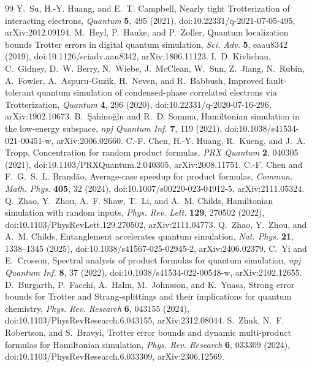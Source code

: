 \documentclass[11pt]{article}
\theoremstyle{plain}
\theoremstyle{definition}
\theoremstyle{remark}
\begin{document}
\begin{thebibliography}{99}
 Y.~Su, H.-Y. Huang, and E.~T. Campbell, Nearly tight Trotterization of interacting electrons, \emph{Quantum} \textbf{5}, 495 (2021), doi:10.22331/q-2021-07-05-495, arXiv:2012.09194.
 M.~Heyl, P.~Hauke, and P.~Zoller, Quantum localization bounds Trotter errors in digital quantum simulation, \emph{Sci. Adv.} \textbf{5}, eaau8342 (2019), doi:10.1126/sciadv.aau8342, arXiv:1806.11123.
 I.~D. Kivlichan, C.~Gidney, D.~W. Berry, N.~Wiebe, J.~McClean, W.~Sun, Z.~Jiang, N.~Rubin, A.~Fowler, A.~Aspuru-Guzik, H.~Neven, and R.~Babbush, Improved fault-tolerant quantum simulation of condensed-phase correlated electrons via Trotterization, \emph{Quantum} \textbf{4}, 296 (2020), doi:10.22331/q-2020-07-16-296, arXiv:1902.10673.
 B.~\c{S}ahino\u{g}lu and R.~D. Somma, Hamiltonian simulation in the low-energy subspace, \emph{npj Quantum Inf.} \textbf{7}, 119 (2021), doi:10.1038/s41534-021-00451-w, arXiv:2006.02660.
 C.-F. Chen, H.-Y. Huang, R.~Kueng, and J.~A. Tropp, Concentration for random product formulas, \emph{PRX Quantum} \textbf{2}, 040305 (2021), doi:10.1103/PRXQuantum.2.040305, arXiv:2008.11751.
 C.-F. Chen and F.~G.~S.~L. Brand\~ao, Average-case speedup for product formulas, \emph{Commun. Math. Phys.} \textbf{405}, 32 (2024), doi:10.1007/s00220-023-04912-5, arXiv:2111.05324.
 Q.~Zhao, Y.~Zhou, A.~F. Shaw, T.~Li, and A.~M. Childs, Hamiltonian simulation with random inputs, \emph{Phys. Rev. Lett.} \textbf{129}, 270502 (2022), doi:10.1103/PhysRevLett.129.270502, arXiv:2111.04773.
 Q.~Zhao, Y.~Zhou, and A.~M. Childs, Entanglement accelerates quantum simulation, \emph{Nat. Phys.} \textbf{21}, 1338--1345 (2025), doi:10.1038/s41567-025-02945-2, arXiv:2406.02379.
 C.~Yi and E.~Crosson, Spectral analysis of product formulas for quantum simulation, \emph{npj Quantum Inf.} \textbf{8}, 37 (2022), doi:10.1038/s41534-022-00548-w, arXiv:2102.12655.
 D.~Burgarth, P.~Facchi, A.~Hahn, M.~Johnsson, and K.~Yuasa, Strong error bounds for Trotter and Strang-splittings and their implications for quantum chemistry, \emph{Phys. Rev. Research} \textbf{6}, 043155 (2024), doi:10.1103/PhysRevResearch.6.043155, arXiv:2312.08044.
 S.~Zhuk, N.~F. Robertson, and S.~Bravyi, Trotter error bounds and dynamic multi-product formulas for Hamiltonian simulation, \emph{Phys. Rev. Research} \textbf{6}, 033309 (2024), doi:10.1103/PhysRevResearch.6.033309, arXiv:2306.12569.

\end{thebibliography}
\end{document}
